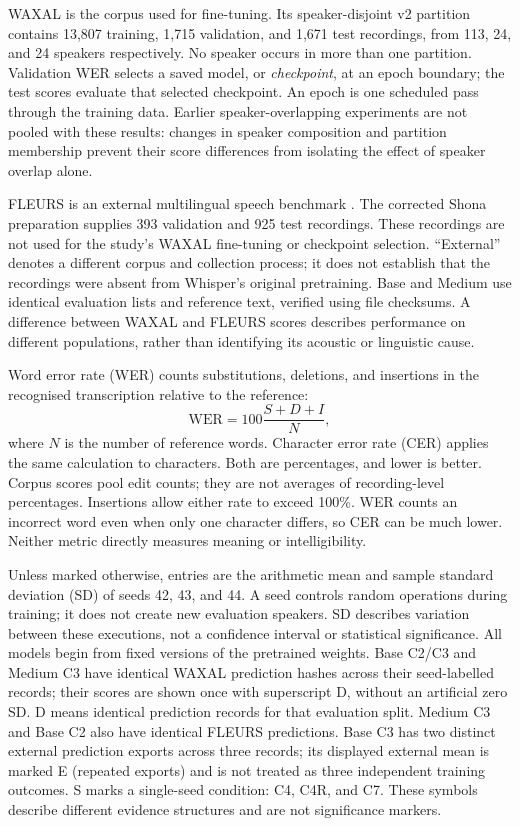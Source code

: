 \documentclass[12pt,a4paper]{report}
\begin{document}
WAXAL is the corpus used for fine-tuning. Its speaker-disjoint v2 partition
contains 13,807 training, 1,715 validation, and 1,671 test recordings, from
113, 24, and 24 speakers respectively. No speaker occurs in more than one
partition. Validation WER selects a saved model, or \emph{checkpoint}, at an
epoch boundary; the test scores evaluate that selected checkpoint. An epoch
is one scheduled pass through the training data. Earlier speaker-overlapping
experiments are not pooled with these results: changes in speaker composition
and partition membership prevent their score differences from isolating the
effect of speaker overlap alone.

FLEURS is an external multilingual speech benchmark \citep{Conneau2022}.
The corrected Shona preparation supplies 393 validation and 925 test recordings.
These recordings are not used for the study's WAXAL fine-tuning or checkpoint
selection. ``External'' denotes a different corpus and collection process;
it does not establish that the recordings were absent from Whisper's original
pretraining. Base and Medium use identical evaluation lists and reference text,
verified using file checksums. A difference between WAXAL and FLEURS scores describes
performance on different populations, rather than identifying its acoustic
or linguistic cause.

Word error rate (WER) counts substitutions, deletions, and insertions in the
recognised transcription relative to the reference:
\begin{equation}
\mathrm{WER}=100\frac{S+D+I}{N},
\end{equation}
where $N$ is the number of reference words. Character error rate (CER) applies
the same calculation to characters. Both are percentages, and lower is better.
Corpus scores pool edit counts; they are not averages of recording-level
percentages. Insertions allow either rate to exceed 100\%. WER counts an
incorrect word even when only one character differs, so CER can be much lower.
Neither metric directly measures meaning or intelligibility.

Unless marked otherwise, entries are the arithmetic mean and sample standard
deviation (SD) of seeds 42, 43, and 44. A seed controls random operations during
training; it does not create new evaluation speakers. SD describes variation
between these executions, not a confidence interval or statistical significance.
All models begin from fixed versions of the pretrained weights. Base C2/C3 and Medium C3
have identical WAXAL prediction hashes across their seed-labelled records;
their scores are shown once with superscript D, without an artificial zero SD. D means identical
prediction records for that evaluation split. Medium C3 and Base C2 also have identical FLEURS predictions. Base
C3 has two distinct external prediction exports across three records; its
displayed external mean is marked E (repeated exports) and is not treated as
three independent training outcomes. S marks a single-seed condition: C4, C4R,
and C7. These symbols describe different evidence structures and are not
significance markers.
\end{document}
